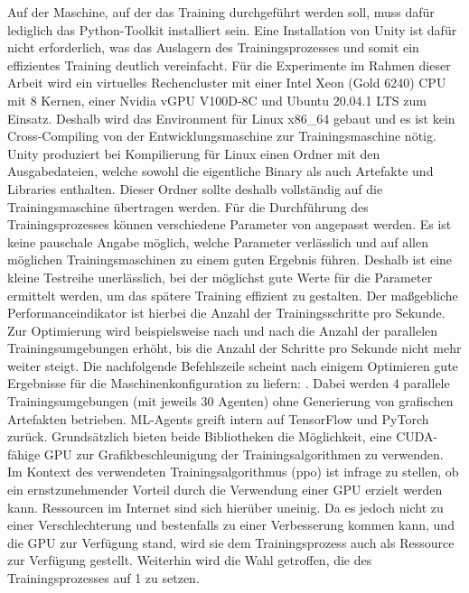 Auf der Maschine, auf der das Training durchgeführt werden soll, muss dafür lediglich das Python-Toolkit installiert sein.
Eine Installation von Unity ist dafür nicht erforderlich, was das Auslagern des Trainingsprozesses und somit ein effizientes Training deutlich vereinfacht.
Für die Experimente im Rahmen dieser Arbeit wird ein virtuelles Rechencluster mit einer Intel Xeon (Gold 6240) CPU mit 8 Kernen, einer Nvidia vGPU V100D-8C und Ubuntu 20.04.1 LTS zum Einsatz.
Deshalb wird das Environment für Linux x86\_64 gebaut und es ist kein Cross-Compiling von der Entwicklungsmaschine zur Trainingsmaschine nötig.
Unity produziert bei Kompilierung für Linux einen Ordner mit den Ausgabedateien, welche sowohl die eigentliche Binary als auch Artefakte und Libraries enthalten.
Dieser Ordner sollte deshalb vollständig auf die Trainingsmaschine übertragen werden.
Für die Durchführung des Trainingsprozesses können verschiedene Parameter von  angepasst werden.
Es ist keine pauschale Angabe möglich, welche Parameter verlässlich und auf allen möglichen Trainingsmaschinen zu einem guten Ergebnis führen.
Deshalb ist eine kleine Testreihe unerlässlich, bei der möglichst gute Werte für die Parameter ermittelt werden, um das spätere Training effizient zu gestalten.
Der maßgebliche Performanceindikator ist hierbei die Anzahl der Trainingsschritte pro Sekunde.
Zur Optimierung wird beispielsweise nach und nach die Anzahl der parallelen Trainingsumgebungen erhöht, bis die Anzahl der Schritte pro Sekunde nicht mehr weiter steigt.
Die nachfolgende Befehlszeile scheint nach einigem Optimieren gute Ergebnisse für die Maschinenkonfiguration zu liefern:
.
Dabei werden 4 parallele Trainingsumgebungen (mit jeweils 30 Agenten) ohne Generierung von grafischen Artefakten betrieben.
ML-Agents greift intern auf TensorFlow und PyTorch zurück.
Grundsätzlich bieten beide Bibliotheken die Möglichkeit, eine CUDA-fähige GPU zur Grafikbeschleunigung der Trainingsalgorithmen zu verwenden.
Im Kontext des verwendeten Trainingsalgorithmus (\ac{ppo}) ist infrage zu stellen, ob ein ernstzunehmender Vorteil durch die Verwendung einer GPU erzielt werden kann.
Ressourcen im Internet sind sich hierüber uneinig.
Da es jedoch nicht zu einer Verschlechterung und bestenfalls zu einer Verbesserung kommen kann, und die GPU zur Verfügung stand, wird sie dem Trainingsprozess auch als Ressource zur Verfügung gestellt.
Weiterhin wird die Wahl getroffen, die  des Trainingsprozesses auf 1 zu setzen.
